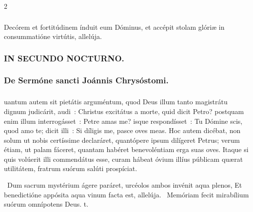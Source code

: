 \documentclass[9pt,twoside]{extarticle}
\begin{document}
\begin{multicols}{2}
{{\subsubsection*{\center {}}
\begin{tightlist}{}
\item {}
\item {} Decórem et fortitúdinem índuit eum Dóminus, et accépit stolam glóriæ in consummatióne virtútis, allelúja. 
\item {}
\item {}
\item {}
\end{tightlist}

\subsubsection*{\center \textsc{IN SECUNDO NOCTURNO.}}
\subsubsection*{\center De Sermóne sancti Joánnis Chrysóstomi.}
\subsubsection*{\center {}}
uantum autem sit pietátis arguméntum, quod Deus illum tanto magistrátu dignum judicárit, audi~: Christus excitátus a morte, quid dicit Petro? postquam enim illum interrogásset~: Petre amas me? isque respondísset~: Tu Dómine scis, quod amo te; dicit illi~: Si díligis me, pasce oves meas. Hoc autem dicébat, non solum ut nobis certíssime declaráret, quantópere ipsum dilígeret Petrus; verum étiam, ut palam fáceret, quantam habéret benevoléntiam erga suas oves. Itaque si quis volúerit illi commendátus esse, curam hábeat óvium illíus públicam quærat utilitátem, fratrum suórum salúti prospíciat.

\begin{tightlist}{}
\item {}~Dum sacrum mystérium ágere paráret, urcéolos ambos invénit aqua plenos, \textred{*} Et benedictióne appósita aqua vinum facta est, allelúja. ~Memóriam fecit mirabílium suórum omnípotens Deus. t.
\end{tightlist}

}}
\end{multicols}
\end{document}
